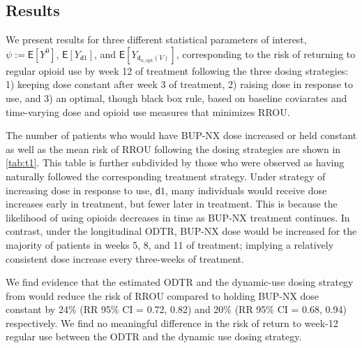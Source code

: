 \documentclass[11pt]{article}
\renewcommand{\d}{\mathsf{d}}
\newcommand{\E}{\mathsf{E}}
\begin{document}


\subsection{Results}
 
We present results for three different statistical parameters of interest, $\psi := \E[Y^0]$, $\E[Y_{\d1}]$, and $\E[Y_{\d_{n, \text{opt}}(V)}]$, corresponding to the risk of returning to regular opioid use by week 12 of treatment following the three dosing strategies: 1) keeping dose constant after week 3 of treatment, 2) raising dose in response to use, and 3) an optimal, though black box rule, based on baseline coviarates and time-varying dose and opioid use measures that minimizes RROU. 

The number of patients who would have BUP-NX dose increased or held constant as well as the mean risk of RROU following the dosing strategies are shown in \ref{tab:t1}. This table is further subdivided by those who were observed as having naturally followed the corresponding treatment strategy. Under strategy of increasing dose in response to use, $\d1$, many individuals would receive dose increases early in treatment, but fewer later in treatment. This is because the likelihood of using opioids decreases in time as BUP-NX treatment continues. In contrast, under the longitudinal ODTR, BUP-NX dose would be increased for the majority of patients in weeks 5, 8, and 11 of treatment; implying a relatively consistent dose increase every three-weeks of treatment. 

We find evidence that the estimated ODTR and the dynamic-use dosing strategy from \citet{rudolph2022dose} would reduce the risk of RROU compared to holding BUP-NX dose constant by 24\% (RR 95\% CI = 0.72, 0.82) and 20\% (RR 95\% CI = 0.68, 0.94) respectively. We find no meaningful difference in the risk of return to week-12 regular use between the ODTR and the dynamic use dosing strategy.
\end{document}
